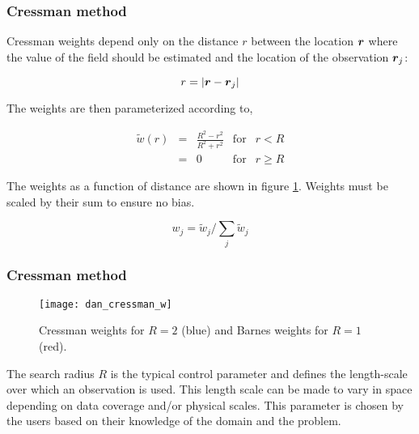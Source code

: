 \begin{frame}
\frametitle{Cressman method}

Cressman weights depend only on the distance $r$ between the location
$\mbox{\boldmath $ r $}$ where the value of the field should be estimated and the
location of the observation $\mbox{\boldmath $ r $}_j$:

\begin{equation}
r = {\left|\mbox{\boldmath $ r $}-\mbox{\boldmath $ r $}_j\right|}
\end{equation}

The weights are then parameterized according to,

\begin{equation}
\begin{array}{rclrr}
\tilde{w}(r) &=& \frac{R^2-r^2}{R^2+r^2} & \mbox{for} & r < R \\ &=& 0
& \mbox{for} & r \ge R
   \end{array}
\end{equation}

The weights as a function of distance are shown in figure
\ref{fig:dan_cressman_w}.  Weights must be scaled by their sum to
ensure no bias.

\begin{equation}
w_j= \tilde{w}_j/\sum_j \tilde{w}_j
\end{equation}

\end{frame}


\begin{frame}
\frametitle{Cressman method}

\begin{figure}[H] 
\centerline{\texttt{[image: dan\_cressman\_w]}}
\caption{Cressman weights for $R=2$ (blue) and Barnes weights for
  $R=1$ (red).}
\label{fig:dan_cressman_w}
\end{figure}

\vspace{-1cm}

The search radius $R$ is the typical control parameter and defines the
length-scale over which an observation is used.  This length scale
can be made to vary in space depending on data coverage and/or
physical scales. This parameter is chosen by the users based on their
knowledge of the domain and the problem.

\end{frame}

